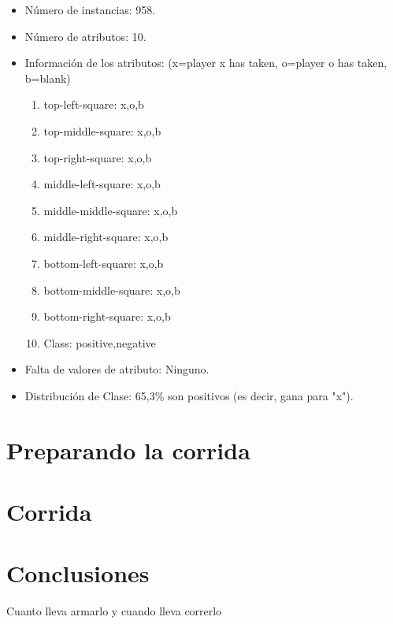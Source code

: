 \documentclass[12pt,titlepage]{article}
\begin{document}
\begin{itemize}
 \item N\'umero de instancias: 958.
 \item N\'umero de atributos: 10.
 \item Informaci\'on de los atributos: (x=player x has taken, o=player o has taken, b=blank)
    \begin{enumerate}
      \item top-left-square: {x,o,b}
      \item top-middle-square: {x,o,b}
      \item top-right-square: {x,o,b}
      \item middle-left-square: {x,o,b}
      \item middle-middle-square: {x,o,b}
      \item middle-right-square: {x,o,b}
      \item bottom-left-square: {x,o,b}
      \item bottom-middle-square: {x,o,b}
      \item bottom-right-square: {x,o,b}
      \item Class: {positive,negative}
    \end{enumerate}
 \item Falta de valores de atributo: Ninguno.
 \item Distribución de Clase: 65,3\% son positivos (es decir, gana para "x").
\end{itemize}

\section{Preparando la corrida}



\section{Corrida}



\section{Conclusiones}
Cuanto lleva armarlo y cuando lleva correrlo



\end{document}
